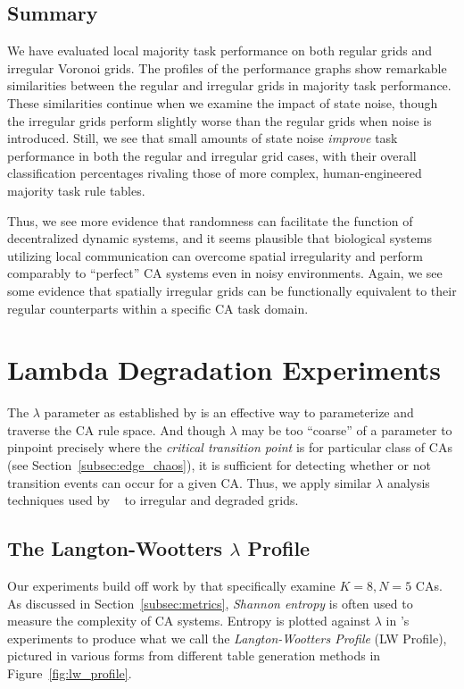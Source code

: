 \documentclass[a4paper,11pt]{article}
\begin{document}
\subsection{Summary}
We have evaluated local majority task performance on both regular grids and irregular Voronoi grids. The profiles of the performance graphs show remarkable similarities between the regular and irregular grids in majority task performance. These similarities continue when we examine the impact of state noise, though the irregular grids perform slightly worse than the regular grids when noise is introduced. Still, we see that small amounts of state noise \textit{improve} task performance in both the regular and irregular grid cases, with their overall classification percentages rivaling those of more complex, human-engineered majority task rule tables.

Thus, we see more evidence that randomness can facilitate the function of decentralized dynamic systems, and it seems plausible that biological systems utilizing local communication can overcome spatial irregularity and perform comparably to ``perfect'' CA systems even in noisy environments. Again, we see some evidence that spatially irregular grids can be functionally equivalent to their regular counterparts within a specific CA task domain.


\section{Lambda Degradation Experiments}
\label{sec:lambda_degen}
The $\lambda$ parameter as established by \citeauthor{la90} is an effective way to parameterize and traverse the CA rule space. And though $\lambda$ may be too ``coarse'' of a parameter to pinpoint precisely where the \textit{critical transition point} is for particular class of CAs (see Section~\ref{subsec:edge_chaos}), it is sufficient for detecting whether or not transition events can occur for a given CA. Thus, we apply similar $\lambda$ analysis techniques used by \citeauthor{wo90}~\cite{la90,wo90} to irregular and degraded grids.

\subsection{The Langton-Wootters $\lambda$ Profile}
Our experiments build off work by \citeauthor{wo90} that specifically examine $K=8, N=5$ CAs. As discussed in Section~\ref{subsec:metrics}, \textit{Shannon entropy} is often used to measure the complexity of CA systems. Entropy is plotted against $\lambda$ in \citeauthor{wo90}'s experiments to produce what we call the \textit{Langton-Wootters Profile} (LW Profile), pictured in various forms from different table generation methods in Figure~\ref{fig:lw_profile}.
\end{document}

